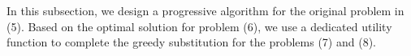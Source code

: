 \documentclass[journal]{IEEEtran}
\begin{document}
   
  
   
   
   
   
   In this subsection, we design a progressive algorithm for the original problem in (5). Based on the optimal solution for problem (6), we use a dedicated utility function to complete the greedy substitution for the problems (7) and (8). 
  
\end{document}
